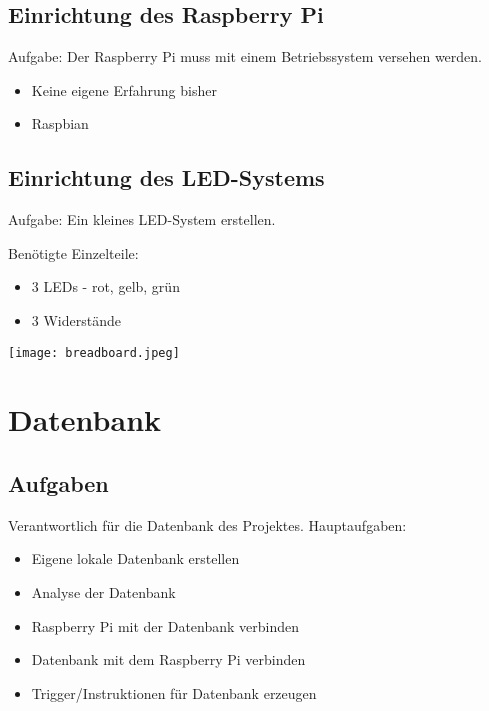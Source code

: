 \documentclass[ignorenonframetext, 11pt, table]{beamer}
\begin{document}
\subsection{Einrichtung des Raspberry Pi}
\begin{frame}
Aufgabe: Der Raspberry Pi muss mit einem Betriebssystem versehen werden. \pause
\begin{itemize}
\item Keine eigene Erfahrung bisher \pause
\item Raspbian
\end{itemize}
\end{frame}

\subsection{Einrichtung des LED-Systems}
\begin{frame}
Aufgabe: Ein kleines LED-System erstellen.\newline \pause

Benötigte Einzelteile:  \pause
\begin{itemize}
\item 3 LEDs - rot, gelb, grün \pause
\item 3 Widerstände
\end{itemize}
\end{frame}
\begin{frame}
\begin{center}
\texttt{[image: breadboard.jpeg]}
\end{center}
\end{frame}

\section{Datenbank}
\subsection{Aufgaben}
\begin{frame}
Verantwortlich für die Datenbank des Projektes. \newline\newline\pause
Hauptaufgaben:\pause
\begin{itemize}
\item Eigene lokale Datenbank erstellen \pause
\item Analyse der Datenbank\pause
\item Raspberry Pi mit der Datenbank verbinden\pause
\item Datenbank mit dem Raspberry Pi verbinden\pause
\item Trigger/Instruktionen für Datenbank erzeugen
\end{itemize}
\end{frame}
\end{document}
